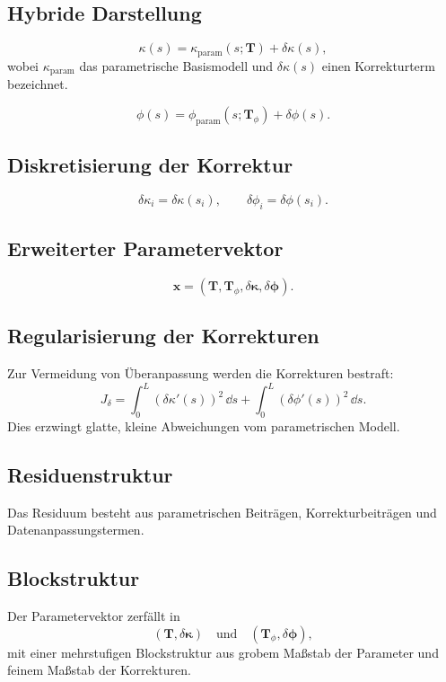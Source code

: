 \subsection{Hybride Darstellung}
\begin{definition}
\[
\kappa(s)=\kappa_{\mathrm{param}}(s;\mathbf T)+\delta\kappa(s),
\]
wobei \(\kappa_{\mathrm{param}}\) das parametrische Basismodell und
\(\delta\kappa(s)\) einen Korrekturterm bezeichnet.
\end{definition}
\begin{definition}
\[
\phi(s)=\phi_{\mathrm{param}}(s;\mathbf T_\phi)+\delta\phi(s).
\]
\end{definition}

\subsection{Diskretisierung der Korrektur}
\[
\delta\kappa_i=\delta\kappa(s_i),\qquad
\delta\phi_i=\delta\phi(s_i).
\]

\subsection{Erweiterter Parametervektor}
\begin{definition}
\[
\mathbf x=(\mathbf T,\mathbf T_\phi,
\delta\boldsymbol\kappa,\delta\boldsymbol\phi).
\]
\end{definition}

\subsection{Regularisierung der Korrekturen}
Zur Vermeidung von Überanpassung werden die Korrekturen bestraft:
\[
J_\delta=\int_0^L(\delta\kappa'(s))^2\,\dd s
+\int_0^L(\delta\phi'(s))^2\,\dd s.
\]
Dies erzwingt glatte, kleine Abweichungen vom parametrischen Modell.

\subsection{Residuenstruktur}
Das Residuum besteht aus parametrischen Beiträgen, Korrekturbeiträgen und
Datenanpassungstermen.

\subsection{Blockstruktur}
Der Parametervektor zerfällt in
\[
(\mathbf T,\delta\boldsymbol\kappa)
\quad\text{und}\quad
(\mathbf T_\phi,\delta\boldsymbol\phi),
\]
mit einer mehrstufigen Blockstruktur aus grobem Maßstab der Parameter und
feinem Maßstab der Korrekturen.

